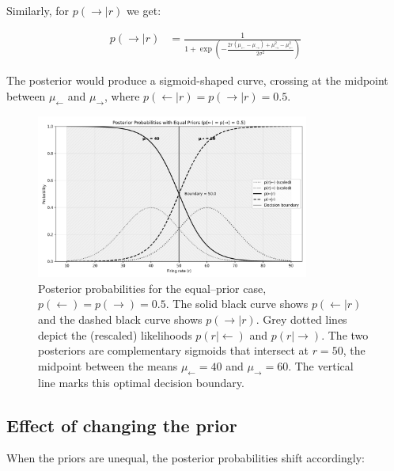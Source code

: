 \documentclass{article}
\begin{document}
Similarly, for $p(\rightarrow|r)$ we get:

\begin{align}
p(\rightarrow|r) &= \frac{1}{1 + \exp\left(-\frac{2r(\mu_\leftarrow - \mu_\rightarrow) + \mu_\rightarrow^2 - \mu_\leftarrow^2}{2\sigma^2}\right)}
\end{align}

The posterior would produce a sigmoid-shaped curve, crossing at the midpoint between $\mu_\leftarrow$ and $\mu_\rightarrow$, where $p(\leftarrow|r) = p(\rightarrow|r) = 0.5$.



\begin{figure}[h]
    \centering
    \includegraphics[width=0.8\textwidth]{posterior_equal_priors.png}
    \caption{Posterior probabilities for the equal--prior case,
    \(p(\leftarrow)=p(\rightarrow)=0.5\).
    The solid black curve shows \(p(\leftarrow\mid r)\) and the dashed black curve
    shows \(p(\rightarrow\mid r)\).
    Grey dotted lines depict the (rescaled) likelihoods
    \(p(r\mid\leftarrow)\) and \(p(r\mid\rightarrow)\).
    The two posteriors are complementary sigmoids that intersect at
    \(r=50\), the midpoint between the means
    \(\mu_{\leftarrow}=40\) and \(\mu_{\rightarrow}=60\).
    The vertical line marks this optimal decision boundary.}
    \label{fig:bayes_posterior}
\end{figure}

\pagebreak


\subsection{Effect of changing the prior}
When the priors are unequal, the posterior probabilities shift accordingly:
\end{document}
